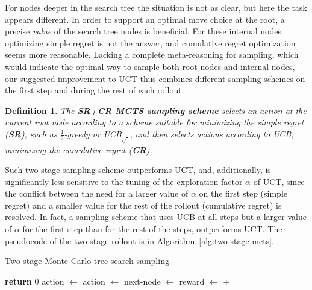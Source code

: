 \documentclass[letterpaper]{article}
\newtheorem{dfn}{Definition}
\begin{document}
For nodes deeper in the search tree the situation is not as clear, but here the task appears different.
In order to support an optimal move choice at the root, a precise {\em value} of the search
tree nodes is beneficial. For these internal nodes optimizing simple regret is not the answer, and 
cumulative regret optimization seems more reasonable. Lacking a complete meta-reasoning for sampling,
which would indicate the optimal way to sample both root nodes and internal nodes,
our suggested improvement to UCT thus combines different sampling schemes on the first step and
during the rest of each rollout:
\begin{dfn}
The \textbf{SR+CR MCTS sampling scheme} selects an action at the
current root node according to a scheme suitable for minimizing 
the simple regret (\textbf{SR}), such as $\frac 1 2$-greedy or UCB$_{\sqrt{\cdot}}$, and
then selects actions according to UCB, minimizing the cumulative regret (\textbf{CR}).
\end{dfn}

Such two-stage sampling scheme outperforms UCT, and, additionally, is
significantly less sensitive to the tuning of the exploration factor
$\alpha$ of UCT, since the conflict between the need for a larger
value of $\alpha$ on the first step (simple regret) and a smaller
value for the rest of the rollout (cumulative regret)
\cite{Bubeck.pure} is resolved. In fact, a sampling scheme that uses
UCB at all steps but a larger value of $\alpha$ for the first step
than for the rest of the steps, outperforms UCT. The pseudocode of the
two-stage rollout is in Algorithm~\ref{alg:two-stage-mcts}.

\begin{algorithm}[h!]
\caption{Two-stage Monte-Carlo tree search sampling}
\label{alg:two-stage-mcts}
\begin{algorithmic}[1]
    \State \textbf{return} 0
  \Else
      \State action $\gets$ 
    \Else
      \State action $\gets$ 
    \EndIf
    \State next-node $\gets$ 
    \State reward $\gets$ 
     \State \hspace{4em} + 
    \State {}
  \EndIf
\EndProcedure
\end{algorithmic}
\end{algorithm}
\end{document}
